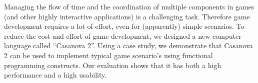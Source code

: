 Managing the flow of time and the coordination of multiple components in games (and other highly interactive applications) is a challenging task. Therefore game development requires a lot of effort, even for (apparently) simple scenarios. To reduce the cost and effort of game development, we designed a new computer language called ``Casanova 2''. Using a case study, we demonstrate that Casanova 2 can be used to implement typical game scenario's using functional programming constructs. Our evaluation shows that it has both a high performance and a high usability.

